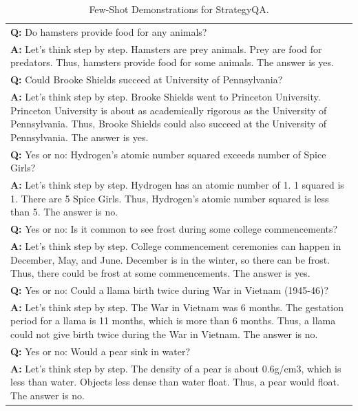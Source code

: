 \documentclass[11pt]{article}
\begin{document}
\begin{table}[ht]
    \centering
    \begin{tabularx}{\textwidth}{X}
    \toprule 
    \textbf{Q: }Do hamsters provide food for any animals? \\
    \textbf{A: } Let's think step by step. Hamsters are prey animals. Prey are food for predators. Thus, hamsters provide food for some animals. The answer is yes. \\
    \hdashline 
    \textbf{Q: }Could Brooke Shields succeed at University of Pennsylvania? \\
    \textbf{A: } Let's think step by step. Brooke Shields went to Princeton University. Princeton University is about as academically rigorous as the University of Pennsylvania. Thus, Brooke Shields could also succeed at the University of Pennsylvania. The answer is yes.\\
    \hdashline
    \textbf{Q: }Yes or no: Hydrogen’s atomic number squared exceeds number of Spice Girls? \\
    \textbf{A: }Let's think step by step. Hydrogen has an atomic number of 1. 1 squared is 1. There are 5 Spice Girls. Thus, Hydrogen’s atomic number squared is less than 5. The answer is no.\\
    \hdashline
    \textbf{Q: }Yes or no: Is it common to see frost during some college commencements? \\
    \textbf{A: }Let's think step by step. College commencement ceremonies can happen in December, May, and June. December is in the winter, so there can be frost. Thus, there could be frost at some commencements. The answer is yes.\\
    \hdashline
    \textbf{Q: }Yes or no: Could a llama birth twice during War in Vietnam (1945-46)? \\
    \textbf{A: }Let's think step by step. The War in Vietnam was 6 months. The gestation period for a llama is 11 months, which is more than 6 months. Thus, a llama could not give birth twice during the War in Vietnam. The answer is no.\\
    \hdashline
    \textbf{Q: }Yes or no: Would a pear sink in water? \\
    \textbf{A: }Let's think step by step. The density of a pear is about 0.6g/cm3, which is less than water. Objects less dense than water float. Thus, a pear would float. The answer is no.\\
    \bottomrule
    \end{tabularx}
    \caption{Few-Shot Demonstrations for StrategyQA.}
    \label{tab:fs_Strategy}
\end{table}
\end{document}
